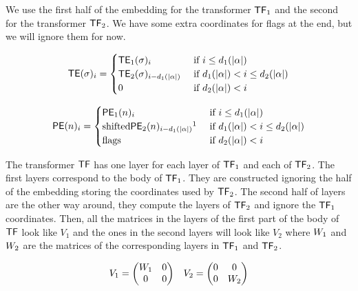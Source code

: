 We use the first half of the embedding for the transformer ${\mathsf{TF}}_1$ and the second for the transformer ${\mathsf{TF}}_2$.
We have some extra coordinates for flags at the end, but we will ignore them for now.

\begin{equation}
    \mathsf{TE}(\sigma)_i = \begin{cases}
        {\mathsf{TE}}_1(\sigma)_i                       &\text{ if } i \leq {d}_1(|\alpha|) \\
        {\mathsf{TE}}_2(\sigma)_{i-{d}_1(|\alpha|)} &\text{ if } {d}_1(|\alpha|) < i \leq {d}_2(|\alpha|) \\
        0                                           &\text{ if } {d}_2(|\alpha|) < i\\
    \end{cases}
\end{equation}

\begin{equation}
    \PE(n)_i = \begin{cases}
        \tfone{\PE}(n)_i                            &\text{ if } i \leq \tfone{d}(|\alpha|) \\
        \text{shifted}\tftwo{\PE}(n)_{i-\tfone{d}(|\alpha|)}\footnotemark      &\text{ if } \tfone{d}(|\alpha|) < i \leq \tftwo{d}(|\alpha|) \\
        \text{flags}                                &\text{ if } \tftwo{d}(|\alpha|) < i\\
    \end{cases}
\end{equation}\label{PE}


The transformer $\mathsf{TF}$ has one layer for each layer of ${\mathsf{TF}}_1$ and each of ${\mathsf{TF}}_2$.
The first layers correspond to the body of ${\mathsf{TF}}_1$.
They are constructed ignoring the half of the embedding storing the coordinates used by ${\mathsf{TF}}_2$.
The second half of layers are the other way around, they compute the layers of ${\mathsf{TF}}_2$ and ignore the ${\mathsf{TF}}_1$ coordinates.
Then, all the matrices in the layers of the first part of the body of $\mathsf{TF}$ look like $V_1$ and the ones in the second layers will look like $V_2$ where ${W}_1$ and ${W}_2$ are the matrices of the corresponding layers in ${\mathsf{TF}}_1$ and ${\mathsf{TF}}_2$.

\begin{align*}
    &V_1 = \left(\begin{matrix}
        {W}_1 & 0 \\
        0  & 0 \\
    \end{matrix}\right)
    &V_2 = \left(\begin{matrix}
        0 & 0 \\
        0  & {W}_2 \\
    \end{matrix}\right)
\end{align*}

